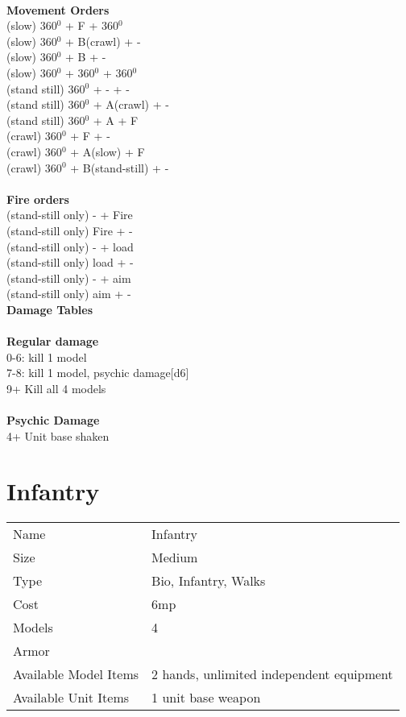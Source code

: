 \ \\ {\bf Movement Orders } \\
(slow) 360$^0$ + F + 360$^0$ \\
(slow) 360$^0$ + B(crawl) + - \\
(slow) 360$^0$ + B + - \\
(slow) 360$^0$ + 360$^0$ + 360$^0$ \\
(stand still) 360$^0$ + - + -  \\
(stand still) 360$^0$ + A(crawl) + - \\
(stand still) 360$^0$ + A + F \\
(crawl) 360$^0$ + F + - \\
(crawl) 360$^0$ + A(slow) + F \\
(crawl) 360$^0$ + B(stand-still) + - \\
\ \\ {\bf Fire orders } \\
(stand-still only) - + Fire \\
(stand-still only) Fire + -  \\
(stand-still only) - + load \\
(stand-still only) load + - \\
(stand-still only) - + aim \\
(stand-still only) aim + -  \\



{\bf Damage Tables} \\
\ \\ {\bf Regular damage } \\
0-6: kill 1 model \\
7-8: kill 1 model, psychic damage[d6] \\
9+ Kill all 4 models \\
\ \\ {\bf Psychic Damage } \\
4+ Unit base shaken \\









\pagebreak

\section{ Infantry }

\begin{tabular}{ll}
  Name & Infantry \\
  Size & Medium\\
  Type & Bio, Infantry, Walks\\
  Cost & 6mp\\
  Models & 4\\
  Armor & \\
  Available Model Items & 2 hands, unlimited independent equipment \\
  Available Unit Items & 1 unit base weapon \\
\end{tabular}

